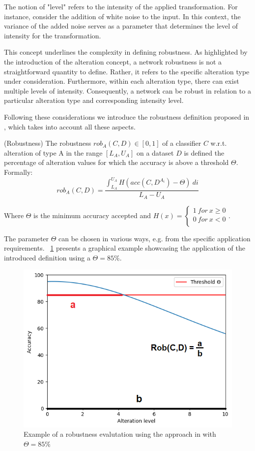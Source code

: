 The notion of "level" refers to the intensity of the applied transformation. For instance, consider the addition of white noise to the input. In this context, the variance of the added noise serves as a parameter that determines the level of intensity for the transformation.

This concept underlines the complexity in defining robustness. As highlighted by the introduction of the alteration concept, a network robustness is not a straightforward quantity to define. Rather, it refers to the specific alteration type under consideration. Furthermore, within each alteration type, there can exist multiple levels of intensity. Consequently, a network can be robust in relation to a particular alteration type and corresponding intensity level.

Following these considerations we introduce the robustness definition proposed in \cite{9176802}, which takes into account all these aspects. 

\begin{definition}\label{def:rob} (Robustness)
	The robustness $rob_A(C,D) \in [0,1]$ of a classifier $C$ w.r.t. alteration of type A in the range $[L_A, U_A]$ on a dataset $D$ is defined the percentage of alteration values for which the accuracy is above a threshold $\Theta$. Formally:
	\[
		rob_A(C,D) = \frac{\int_{L_A}^{U_A} H(acc(C,D^{A_i}) - \Theta) \ di}{L_A - U_A}
	\]
	
	Where $\Theta$ is the minimum accuracy accepted and $ H(x) = \begin{cases}
		1 \ for \ x \geq 0\\
		0 \ for \ x < 0\\
	\end{cases}$.
\end{definition}

The parameter $\Theta$ can be chosen in various ways, e.g. from the specific application requirements. \Fig~\ref{fig:rob_example} presents a graphical example showcasing the application of the introduced definition using a $\Theta = 85\%$.

\begin{figure}[h]
	\centering
	\includegraphics[width=0.7\linewidth]{ImageFiles/ANNRob/rob_example}
	\caption{Example of a robustness evalutation using the approach in \cite{9176802} with $\Theta=85\%$}
	\label{fig:rob_example}
\end{figure}

